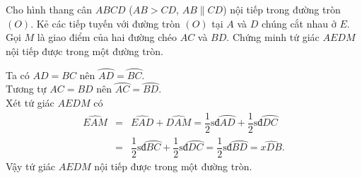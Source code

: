 \begin{bt}%
 Cho hình thang cân $ABCD$ ($AB > CD$, $AB \parallel CD$) nội tiếp trong đường tròn $(O)$. Kẻ các tiếp tuyến với đường tròn $(O)$ tại $A$ và $D$ chúng cắt nhau ở $E$. Gọi $M$ là giao điểm của hai đường chéo $AC$ và $BD$. Chứng minh tứ giác $AEDM$ nội tiếp được trong một đường tròn.
 \loigiai
  {
  \immini
  {
  Ta có $AD=BC$ nên $\wideparen{AD}=\wideparen{BC}$.\\
  Tương tự $AC=BD$ nên $\wideparen{AC}=\wideparen{BD}$.\\
  Xét tứ giác $AEDM$ có
  \allowdisplaybreaks
  \begin{eqnarray*}
   \widehat{EAM} &=& \widehat{EAD}+\widehat{DAM} = \dfrac{1}{2}\text{sđ}\wideparen{AD}+\dfrac{1}{2}\text{sđ}\wideparen{DC}\\
   &=& \dfrac{1}{2}\text{sđ}\wideparen{BC}+\dfrac{1}{2}\text{sđ}\wideparen{DC} = \dfrac{1}{2}\text{sđ}\wideparen{BD} = \widehat{xDB}.
  \end{eqnarray*}
  Vậy tứ giác $AEDM$ nội tiếp được trong một đường tròn.
  }
  {
  }
  }
\end{bt}

